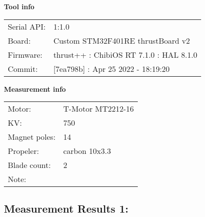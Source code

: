 \documentclass[10pt]{article}
\begin{document}
\noindent
{\large \bf Tool info}
\vspace{3mm}

\noindent
\begin{tabular}{ll}
Serial API:  & 1:1.0\\ 
Board:       & Custom STM32F401RE thrustBoard v2\\ 
Firmware:    & thrust++ : ChibiOS RT 7.1.0 : HAL 8.1.0\\ 
Commit:      & [7ea798b] : Apr 25 2022 - 18:19:20
\end{tabular}
\vspace{3mm}

\noindent
{\large \bf Measurement info}
\vspace{3mm}

\noindent
\begin{tabular}{ll}
Motor:        & T-Motor MT2212-16\\ 
KV:           & 750\\ 
Magnet poles: & 14\\ 
Propeler:     & carbon 10x3.3\\ 
Blade count:  & 2\\ 
Note:         & 
\end{tabular}

\vspace{3mm}


\subsection*{\large \bf Measurement Results 1:}
\end{document}
